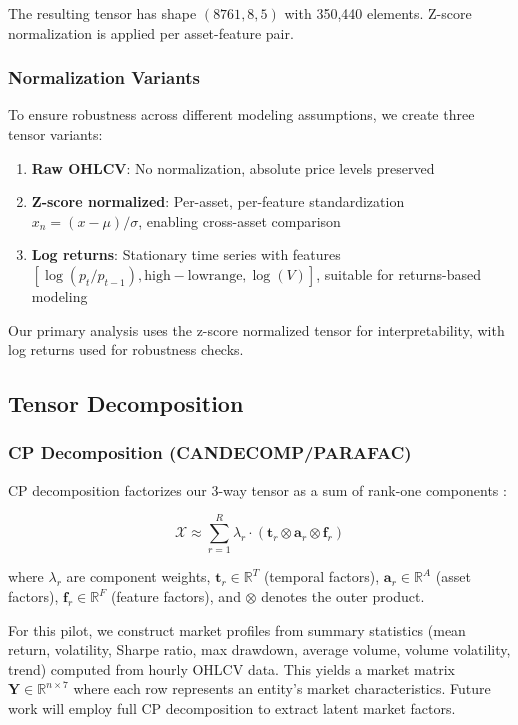 \documentclass[11pt,twocolumn]{article}
\begin{document}
The resulting tensor has shape $(8761, 8, 5)$ with 350,440 elements. Z-score normalization is applied per asset-feature pair.

\subsubsection{Normalization Variants}

To ensure robustness across different modeling assumptions, we create three tensor variants:

\begin{enumerate}[leftmargin=*]
    \item \textbf{Raw OHLCV}: No normalization, absolute price levels preserved
    \item \textbf{Z-score normalized}: Per-asset, per-feature standardization $x_{n} = (x - \mu) / \sigma$, enabling cross-asset comparison
    \item \textbf{Log returns}: Stationary time series with features $[\log(p_t / p_{t-1}), \mathrm{high-low range}, \log(V)]$, suitable for returns-based modeling
\end{enumerate}

Our primary analysis uses the z-score normalized tensor for interpretability, with log returns used for robustness checks.

\subsection{Tensor Decomposition}

\subsubsection{CP Decomposition (CANDECOMP/PARAFAC)}

CP decomposition factorizes our 3-way tensor as a sum of rank-one components \citep{Kolda2009Tensor}:

\begin{equation}
\mathcal{X} \approx \sum_{r=1}^{R} \lambda_r \cdot (\mathbf{t}_r \otimes \mathbf{a}_r \otimes \mathbf{f}_r)
\label{eq:cp}
\end{equation}

where $\lambda_r$ are component weights, $\mathbf{t}_r \in \mathbb{R}^T$ (temporal factors), $\mathbf{a}_r \in \mathbb{R}^A$ (asset factors), $\mathbf{f}_r \in \mathbb{R}^F$ (feature factors), and $\otimes$ denotes the outer product.

For this pilot, we construct market profiles from summary statistics (mean return, volatility, Sharpe ratio, max drawdown, average volume, volume volatility, trend) computed from hourly OHLCV data. This yields a market matrix $\mathbf{Y} \in \mathbb{R}^{n \times 7}$ where each row represents an entity's market characteristics. Future work will employ full CP decomposition to extract latent market factors.
\end{document}
